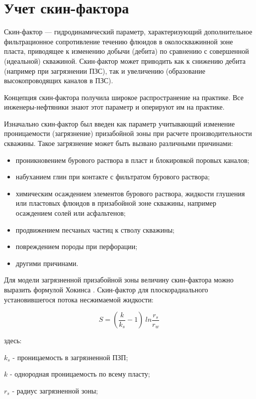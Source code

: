 \section{Учет скин-фактора}

Скин-фактор — гидродинамический параметр, характеризующий дополнительное фильтрационное сопротивление течению флюидов в околоскважинной зоне пласта, приводящее к изменению добычи (дебита) по сравнению с совершенной (идеальной) скважиной. Скин-фактор может приводить как к снижению дебита (например при загрязнении ПЗС), так и увеличению (образование высокопроводящих каналов в ПЗС).

Концепция скин-фактора получила широкое распространение на практике. Все инженеры-нефтяники знают этот параметр и оперируют им на практике. 

Изначально скин-фактор был введен как параметр учитывающий изменение проницаемости (загрязнение) призабойной зоны при расчете производительности скважины. Такое загрязнение может быть вызвано различными причинами:
\begin{itemize}
	\item проникновением бурового раствора в пласт и блокировкой поровых каналов;
	\item набуханием глин при контакте с фильтратом бурового раствора;
	\item химическим осаждением элементов бурового раствора, жидкости глушения или пластовых флюидов в призабойной зоне скважины, например осаждением солей или асфальтенов;
	\item продвижением песчаных частиц к стволу скважины;
	\item повреждением породы при перфорации;
	\item другими причинами.
\end{itemize}	

Для модели загрязненной призабойной зоны величину скин-фактора можно выразить формулой Хокинса \cite{Hawkins_1956}. Скин-фактор для плоскорадиального установившегося потока несжимаемой жидкости:

\begin{equation} \label{eq:skin_hokins}
S =\left( \frac{k}{k_s} -1\right)\ ln\frac{r_s}{r_w}
\end{equation}

здесь:

$k_s$ - проницаемость в загрязненной ПЗП;

$k$ - однородная проницаемость по всему пласту;

$r_s$ - радиус загрязненной зоны;

